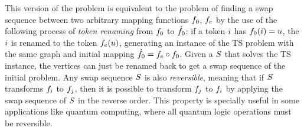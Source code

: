 \documentclass[msc,english,table,xcdraw]{ppgccufmg}
\begin{document}

This version of the problem is equivalent to the
problem of finding a swap sequence between two arbitrary mapping functions
$f_{0}$, $f_e$ by the use of the following process of \textit{token
renaming} from $f_{0}$ to $\dot{f_{0}}$: if a token $i$ has
$f_{0}(i) = u$, the $i$ is renamed to the 
token $f_{e}(u)$, generating an instance of the TS
problem with the same graph and initial mapping $\dot{f_{0}} = f_{e}
\circ f_{0}$. 
Given a $S$ that solves the TS instance, the vertices can just be renamed 
back to get a swap sequence of the initial problem.
Any swap sequence $S$ is also \textit{reversible}, meaning that if 
$S$ transforms $f_{i}$ to $f_{j}$, then it is possible
to transform $f_{j}$ to $f_{i}$ by applying the swap 
sequence of $S$ in the reverse order.
This property is specially useful in some applications like quantum computing,
where all quantum logic operations must be reversible.


\end{document}
